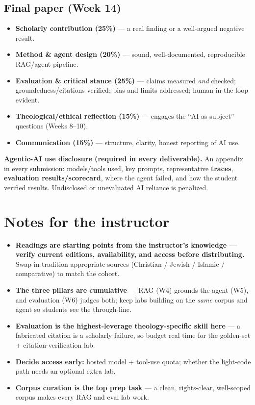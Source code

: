 \documentclass[11pt]{article}
\begin{document}
\subsection*{Final paper (Week 14)}
\begin{itemize}[leftmargin=1.4em,itemsep=1pt]
  \item \textbf{Scholarly contribution (25\%)} --- a real finding or a well-argued negative result.
  \item \textbf{Method \& agent design (20\%)} --- sound, well-documented, reproducible RAG/agent pipeline.
  \item \textbf{Evaluation \& critical stance (25\%)} --- claims measured \emph{and} checked; groundedness/citations
    verified; bias and limits addressed; human-in-the-loop evident.
  \item \textbf{Theological/ethical reflection (15\%)} --- engages the ``AI as subject'' questions (Weeks 8--10).
  \item \textbf{Communication (15\%)} --- structure, clarity, honest reporting of AI use.
\end{itemize}

\begin{tcolorbox}[colback=light,colframe=accent,boxrule=0.5pt,arc=2pt,left=8pt,right=8pt,top=5pt,bottom=5pt]
\small\textbf{Agentic-AI use disclosure (required in every deliverable).}
An appendix in every submission: models/tools used, key prompts, representative \textbf{traces},
\textbf{evaluation results/scorecard}, where the agent failed, and how the student verified results.
Undisclosed or unevaluated AI reliance is penalized.
\end{tcolorbox}

\section{Notes for the instructor}
\begin{itemize}[leftmargin=1.4em,itemsep=2pt]
  \item \textbf{Readings are starting points from the instructor's knowledge --- verify current editions,
    availability, and access before distributing.} Swap in tradition-appropriate sources
    (Christian / Jewish / Islamic / comparative) to match the cohort.
  \item \textbf{The three pillars are cumulative} --- RAG (W4) grounds the agent (W5), and evaluation (W6)
    judges both; keep labs building on the \emph{same} corpus and agent so students see the through-line.
  \item \textbf{Evaluation is the highest-leverage theology-specific skill here} --- a fabricated citation is a
    scholarly failure, so budget real time for the golden-set + citation-verification lab.
  \item \textbf{Decide access early:} hosted model + tool-use quota; whether the light-code path needs an
    optional extra lab.
  \item \textbf{Corpus curation is the top prep task} --- a clean, rights-clear, well-scoped corpus makes every
    RAG and eval lab work.
\end{itemize}
\end{document}
